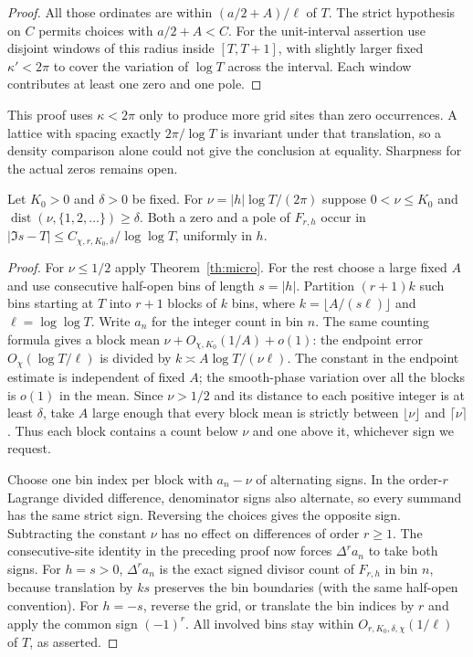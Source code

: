 \begin{proof}
All those ordinates are within $(a/2+A)/\ell$ of $T$.
The strict hypothesis on $C$ permits choices with $a/2+A<C$.
For the unit-interval assertion use disjoint windows of this radius
inside $[T,T+1]$, with slightly larger fixed $\kappa'<2\pi$
to cover the variation of $\log T$ across the interval.
Each window contributes at least one zero and one pole.
\end{proof}

This proof uses $\kappa<2\pi$ only to produce more grid sites than zero
occurrences. A lattice with spacing exactly $2\pi/\log T$ is invariant
under that translation, so a density comparison alone could not give
the conclusion at equality. Sharpness for the actual zeros remains open.

\begin{corollary}\label{cor:nonres}
Let $K_0>0$ and $\delta>0$ be fixed. For
$\nu=|h|\log T/(2\pi)$ suppose $0<\nu\le K_0$ and
$\operatorname{dist}(\nu,\{1,2,\ldots\})\ge\delta$.
Both a zero and a pole of $F_{r,h}$ occur in
$|\Im s-T|\le C_{\chi,r,K_0,\delta}/\log\log T$, uniformly in $h$.
\end{corollary}
\begin{proof}
For $\nu\le1/2$ apply Theorem~\ref{th:micro}. For the rest choose a
large fixed $A$ and use consecutive half-open bins of length $s=|h|$.
Partition $(r+1)k$ such bins starting at $T$ into $r+1$ blocks of $k$
bins, where $k=\lfloor A/(s\ell)\rfloor$ and $\ell=\log\log T$.
Write $a_n$ for the integer count in bin $n$. The same counting formula
gives a block mean $\nu+O_{\chi,K_0}(1/A)+o(1)$: the endpoint error
$O_\chi(\log T/\ell)$ is divided by $k\asymp A\log T/(\nu\ell)$.
The constant in the endpoint estimate is independent of fixed $A$;
the smooth-phase variation over all the blocks is $o(1)$ in the mean.
Since $\nu>1/2$ and its distance to each positive integer is at least
$\delta$, take $A$ large enough that every block mean is strictly between
$\lfloor\nu\rfloor$ and $\lceil\nu\rceil$. Thus each block contains
a count below $\nu$ and one above it, whichever sign we request.

Choose one bin index per block with $a_n-\nu$ of alternating signs.
In the order-$r$ Lagrange divided difference, denominator signs also
alternate, so every summand has the same strict sign. Reversing the
choices gives the opposite sign. Subtracting the constant $\nu$ has no
effect on differences of order $r\ge1$. The consecutive-site identity
in the preceding proof now forces $\Delta^r a_n$ to take both signs.
For $h=s>0$, $\Delta^r a_n$ is the exact signed divisor count of
$F_{r,h}$ in bin $n$, because translation by $ks$ preserves the bin
boundaries (with the same half-open convention). For $h=-s$, reverse
the grid, or translate the bin indices by $r$ and apply the common
sign $(-1)^r$. All involved bins stay within $O_{r,K_0,\delta,\chi}
(1/\ell)$ of $T$, as asserted.
\end{proof}
